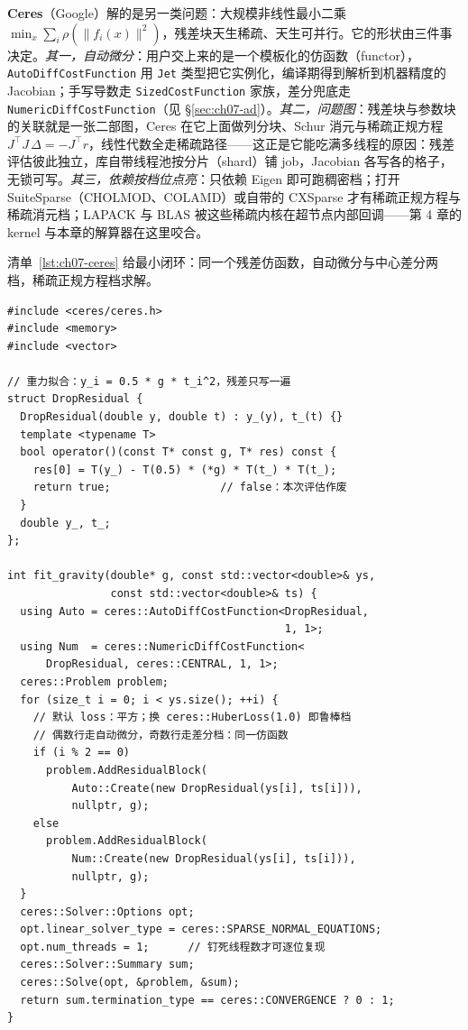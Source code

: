 \documentclass[12pt,a4paper,fontset=fandol]{ctexbook}
\newcommand{\Tp}[1]{\texttt{#1}}
\newcommand{\Bk}{\allowbreak}
\newcommand{\Lib}[1]{\textbf{#1}}
\begin{document}
\Lib{Ceres}（Google）解的是另一类问题：大规模非线性最小二乘 $\min_x \sum_i \rho(\|f_i(x)\|^2)$，残差块天生稀疏、天生可并行。它的形状由三件事决定。\emph{其一，自动微分}：用户交上来的是一个模板化的仿函数（functor），\Tp{AutoDiffCostFunction} \Bk{} 用 \Tp{Jet} 类型把它实例化，编译期得到解析到机器精度的 Jacobian；手写导数走 \Tp{SizedCostFunction} 家族，差分兜底走 \Tp{NumericDiffCostFunction}（见 \S\ref{sec:ch07-ad}）。\emph{其二，问题图}：残差块与参数块的关联就是一张二部图，Ceres 在它上面做列分块、Schur 消元与稀疏正规方程 $J^{\top}J\,\Delta = -J^{\top}r$，线性代数全走稀疏路径——这正是它能吃满多线程的原因：残差评估彼此独立，库自带线程池按分片（shard）铺 job，Jacobian 各写各的格子，无锁可写。\emph{其三，依赖按档位点亮}：只依赖 Eigen 即可跑稠密档；打开 SuiteSparse（CHOLMOD、COLAMD）或自带的 CXSparse 才有稀疏正规方程与稀疏消元档；LAPACK 与 BLAS 被这些稀疏内核在超节点内部回调——第 4 章的 kernel 与本章的解算器在这里咬合。

清单~\ref{lst:ch07-ceres} 给最小闭环：同一个残差仿函数，自动微分与中心差分两档，稀疏正规方程档求解。

\begin{lstlisting}[style=cppstyle,caption={Ceres：模板仿函数、\Tp{AutoDiffCostFunction} 与稀疏正规方程},label={lst:ch07-ceres}]
#include <ceres/ceres.h>
#include <memory>
#include <vector>

// 重力拟合：y_i = 0.5 * g * t_i^2，残差只写一遍
struct DropResidual {
  DropResidual(double y, double t) : y_(y), t_(t) {}
  template <typename T>
  bool operator()(const T* const g, T* res) const {
    res[0] = T(y_) - T(0.5) * (*g) * T(t_) * T(t_);
    return true;                 // false：本次评估作废
  }
  double y_, t_;
};

int fit_gravity(double* g, const std::vector<double>& ys,
                const std::vector<double>& ts) {
  using Auto = ceres::AutoDiffCostFunction<DropResidual,
                                           1, 1>;
  using Num  = ceres::NumericDiffCostFunction<
      DropResidual, ceres::CENTRAL, 1, 1>;
  ceres::Problem problem;
  for (size_t i = 0; i < ys.size(); ++i) {
    // 默认 loss：平方；换 ceres::HuberLoss(1.0) 即鲁棒档
    // 偶数行走自动微分，奇数行走差分档：同一仿函数
    if (i % 2 == 0)
      problem.AddResidualBlock(
          Auto::Create(new DropResidual(ys[i], ts[i])),
          nullptr, g);
    else
      problem.AddResidualBlock(
          Num::Create(new DropResidual(ys[i], ts[i])),
          nullptr, g);
  }
  ceres::Solver::Options opt;
  opt.linear_solver_type = ceres::SPARSE_NORMAL_EQUATIONS;
  opt.num_threads = 1;      // 钉死线程数才可逐位复现
  ceres::Solver::Summary sum;
  ceres::Solve(opt, &problem, &sum);
  return sum.termination_type == ceres::CONVERGENCE ? 0 : 1;
}
\end{lstlisting}
\end{document}
